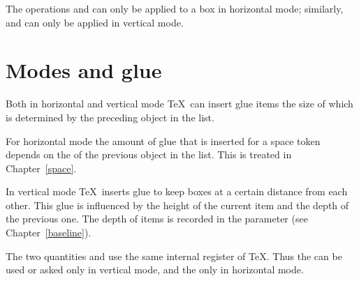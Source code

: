 \documentclass{book}
\begin{document}
The operations  and  can only be
applied to a box in horizontal mode; similarly,  and
 can only be applied in vertical mode.


\section{Modes and glue}

Both in horizontal and vertical mode
\TeX\ can insert glue items the size of which is
determined by the preceding object in the list.

For horizontal mode the amount of glue that is inserted
for a space token depends on the  of
the previous object in the list. This is treated
in Chapter~\ref{space}.

In vertical mode \TeX\ inserts glue to keep boxes at a certain
distance from each other. This glue is influenced by the
height of the current item and the depth of the previous one.
The depth of items is recorded in the  parameter
(see Chapter~\ref{baseline}).

The two quantities  
and  
use the same internal register of \TeX. Thus the 
can be used or asked only in vertical mode, and the 
only in horizontal mode.
\end{document}
